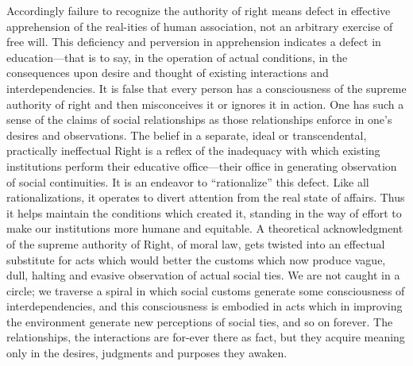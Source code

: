 Accordingly failure to recognize the authority of right means defect
in effective apprehension of the real-ities of human
association, not an arbitrary exercise of free will. This deficiency
and perversion in apprehension indicates a defect in education---that
is to say, in the operation of actual conditions, in the consequences
upon desire and thought of existing interactions and
interdependencies. It is false that every person has a consciousness
of the supreme authority of right and then misconceives it or ignores
it in action. One has such a sense of the claims of social
relationships as those relationships enforce in one's desires and
observations. The belief in a separate, ideal or transcendental,
practically ineffectual Right is a reflex of the inadequacy with which
existing institutions perform their educative of\-fice---their office
in generating observation of social continuities. It is an endeavor to
``rationalize'' this defect. Like all rationalizations, it operates to
divert attention from the real state of affairs. Thus it helps
maintain the conditions which created it, standing in the way of
effort to make our institutions more humane and equitable. A
theoretical acknowledgment of the supreme authority of Right, of moral
law, gets twisted into an effectual substitute for acts which would
better the customs which now produce vague, dull, halting and evasive
observation of actual social ties. We are not caught in a circle; we
traverse a spiral in which social customs generate some consciousness
of interdependencies, and this consciousness is embodied in acts which
in improving the environment generate new perceptions of social ties,
and so on forever. The relationships, the interactions are
for-ever there as fact, but they acquire meaning only in the
desires, judgments and purposes they awaken.

